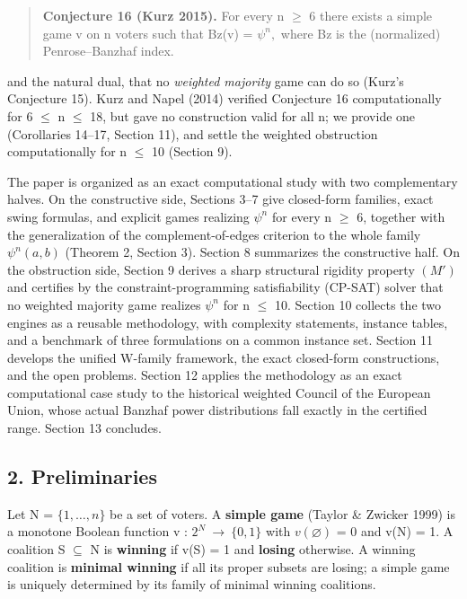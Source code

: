 \documentclass[
]{article}
\begin{document}
\begin{quote}
\textbf{Conjecture 16 (Kurz 2015).} For every n \(\ge\) 6 there exists a
simple game v on n voters such that Bz(v) = \(\psi^n,\) where Bz is the
(normalized) Penrose--Banzhaf index.
\end{quote}

and the natural dual, that no \emph{weighted majority} game can do so
(Kurz's Conjecture 15). Kurz and Napel (2014) verified Conjecture 16
computationally for 6 \(\le\) n \(\le\) 18, but gave no construction
valid for all n; we provide one (Corollaries 14--17, Section 11), and
settle the weighted obstruction computationally for n \(\le\) 10
(Section 9).

The paper is organized as an exact computational study with two
complementary halves. On the constructive side, Sections 3--7 give
closed-form families, exact swing formulas, and explicit games realizing
\(\psi^n\) for every n \(\ge\) 6, together with the generalization of
the complement-of-edges criterion to the whole family \(\psi^n(a,b)\)
(Theorem 2, Section 3). Section 8 summarizes the constructive half. On
the obstruction side, Section 9 derives a sharp structural rigidity
property \((M')\) and certifies by the constraint-programming
satisfiability (CP-SAT) solver that no weighted majority game realizes
\(\psi^n\) for n \(\le\) 10. Section 10 collects the two engines as a
reusable methodology, with complexity statements, instance tables, and a
benchmark of three formulations on a common instance set. Section 11
develops the unified W-family framework, the exact closed-form
constructions, and the open problems. Section 12 applies the methodology
as an exact computational case study to the historical weighted Council
of the European Union, whose actual Banzhaf power distributions fall
exactly in the certified range. Section 13 concludes.

\subsection{2. Preliminaries}\label{preliminaries}

Let N = \(\{1,\dots,n\}\) be a set of voters. A \textbf{simple game}
(Taylor \& Zwicker 1999) is a monotone Boolean function v :
\(2^N\ \to\ \{0,1\}\) with \(v(\varnothing)\) = 0 and v(N) = 1. A
coalition S \(\subseteq\) N is \textbf{winning} if v(S) = 1 and
\textbf{losing} otherwise. A winning coalition is \textbf{minimal
winning} if all its proper subsets are losing; a simple game is uniquely
determined by its family of minimal winning coalitions.
\end{document}
